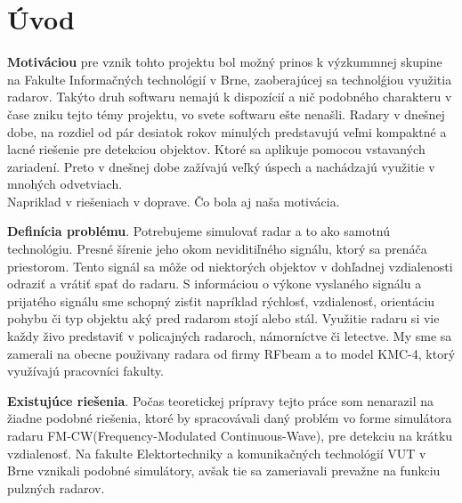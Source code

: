 \documentclass[slovak]{ExcelAtFIT} %
\affiliation{*%
  \href{mailto:xormos00@stud..vutbr.cz}{xormos00@stud..vutbr.cz},
  \textit{Fakulta informačních Technologií, Vysoké učení technické v Brně}}
\begin{document}
\startdocument



\section{Úvod}
\label{sec:Intorduction}
\hspace{0.6cm}\textbf{Motiváciou} pre vznik tohto projektu bol možný prinos k výzkummnej skupine na Fakulte Informačných technológií v Brne, zaoberajúcej sa technolǵiou využitia radarov. Takýto druh softwaru nemajú k dispozícií a nič podobného charakteru v čase zniku tejto témy projektu, vo svete softwaru ešte nenašli.
Radary v dnešnej dobe, na rozdiel od pár desiatok rokov minulých predstavujú veľmi kompaktné a lacné riešenie pre detekciou objektov. Ktoré sa aplikuje pomocou vstavaných zariadení. Preto v dnešnej dobe zažívajú veľký úspech a nachádzajú využitie v mnohých odvetviach. \\Napriklad v riešeniach v doprave. Čo bola aj naša motivácia.

\textbf{Definícia problému}. Potrebujeme simulovať radar a to ako samotnú technológiu. Presné šírenie jeho okom neviditiľného signálu, ktorý sa prenáča priestorom. Tento signál sa môže od niektorých objektov v dohľa\-dnej vzdialenosti odraziť a vrátiť spať do radaru. S informáciou o výkone vyslaného signálu a prijatého signálu sme schopný zisťit napríklad rýchlosť, vzdialenosť, orientáciu pohybu či typ objektu aký pred radarom stojí alebo stál.
Využitie radaru si vie každy živo predstaviť v policajných radaroch, námorníctve či letectve.
My sme sa zamerali na obecne použivany radara od firmy RFbeam a to model KMC-4, ktorý využívajú pracovníci fakulty.

\textbf{Existujúce riešenia}. Počas teoretickej prípravy tejto práce som nenarazil na žiadne podobné riešenia, ktoré by spracovávali daný problém vo forme simulátora radaru FM-CW(Frequency-Modulated Continuous-Wa\-ve), pre detekciu na krátku vzdialenosť.
Na fakulte Elektortechniky a komunikačných technológií VUT v Brne vznikali podobné simulátory, avšak tie sa zameriavali prevažne na funkciu pulzných radarov.
\end{document}

